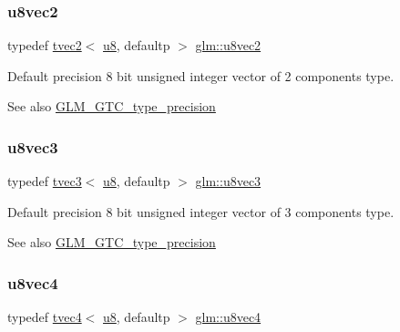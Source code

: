 \subsubsection{\texorpdfstring{u8vec2}{u8vec2}}
{\footnotesize\ttfamily typedef \hyperlink{structglm_1_1tvec2}{tvec2}$<$ \hyperlink{group__gtc__type__precision_ga5e3dc67373d5068997d2d9f41c9024d2}{u8}, defaultp $>$ \hyperlink{group__gtc__type__precision_ga1c259b876f8757eb197b83a5fab476f0}{glm\+::u8vec2}}

Default precision 8 bit unsigned integer vector of 2 components type. \begin{DoxySeeAlso}{See also}
\hyperlink{group__gtc__type__precision}{G\+L\+M\+\_\+\+G\+T\+C\+\_\+type\+\_\+precision} 
\end{DoxySeeAlso}
\mbox{\label{group__gtc__type__precision_ga8262aeb120701de1b57773eb10be0f35}} 
\subsubsection{\texorpdfstring{u8vec3}{u8vec3}}
{\footnotesize\ttfamily typedef \hyperlink{structglm_1_1tvec3}{tvec3}$<$ \hyperlink{group__gtc__type__precision_ga5e3dc67373d5068997d2d9f41c9024d2}{u8}, defaultp $>$ \hyperlink{group__gtc__type__precision_ga8262aeb120701de1b57773eb10be0f35}{glm\+::u8vec3}}

Default precision 8 bit unsigned integer vector of 3 components type. \begin{DoxySeeAlso}{See also}
\hyperlink{group__gtc__type__precision}{G\+L\+M\+\_\+\+G\+T\+C\+\_\+type\+\_\+precision} 
\end{DoxySeeAlso}
\mbox{\label{group__gtc__type__precision_gaf3c840b8a90a194559121504ba599197}} 
\subsubsection{\texorpdfstring{u8vec4}{u8vec4}}
{\footnotesize\ttfamily typedef \hyperlink{structglm_1_1tvec4}{tvec4}$<$ \hyperlink{group__gtc__type__precision_ga5e3dc67373d5068997d2d9f41c9024d2}{u8}, defaultp $>$ \hyperlink{group__gtc__type__precision_gaf3c840b8a90a194559121504ba599197}{glm\+::u8vec4}}

